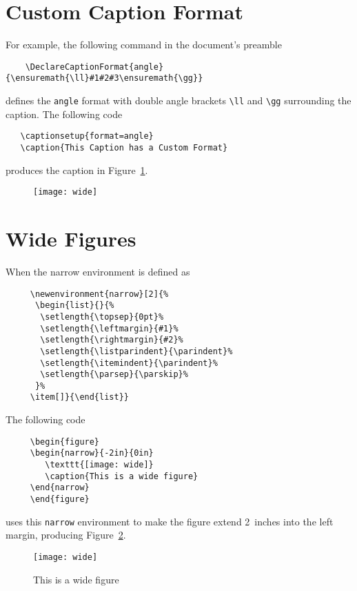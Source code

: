 \documentclass{article}
\newenvironment{narrow}[2]{%
 \begin{list}{}{%
  \setlength{\topsep}{0pt}%
  \setlength{\leftmargin}{#1}%
  \setlength{\rightmargin}{#2}%
  \setlength{\listparindent}{\parindent}%
  \setlength{\itemindent}{\parindent}%
  \setlength{\parsep}{\parskip}%
 }%
\item[]}{\end{list}}
\begin{document}
\newlength{\marginwidth}
\setlength{\marginwidth}{\marginparwidth}
\addtolength{\marginwidth}{\marginparsep}

\section{Custom Caption Format}

For example, the following command in the document's preamble
\begin {verbatim}
    \DeclareCaptionFormat{angle}{\ensuremath{\ll}#1#2#3\ensuremath{\gg}}
\end {verbatim}
defines the \texttt{angle} format with double angle brackets 
\verb+\ll+ and \verb+\gg+ surrounding the caption.
The following code
\begin {verbatim}
   \captionsetup{format=angle}
   \caption{This Caption has a Custom Format}
\end {verbatim}
produces the caption in Figure~\ref{fig:caption:angle}.
\begin{figure}[htbp]
    \centering
    \captionsetup{format=angle}
    \texttt{[image: wide]}
    \label{fig:caption:angle}
\end{figure}

\section{Wide Figures}
When the narrow environment is defined as
\begin {verbatim}
     \newenvironment{narrow}[2]{%
      \begin{list}{}{%
       \setlength{\topsep}{0pt}%
       \setlength{\leftmargin}{#1}%
       \setlength{\rightmargin}{#2}%
       \setlength{\listparindent}{\parindent}%
       \setlength{\itemindent}{\parindent}%
       \setlength{\parsep}{\parskip}%
      }%
     \item[]}{\end{list}} 
\end {verbatim}
The following code 
\begin {verbatim}
     \begin{figure}
     \begin{narrow}{-2in}{0in}
        \texttt{[image: wide]}
        \caption{This is a wide figure}
     \end{narrow}
     \end{figure}
\end {verbatim}
uses this \texttt{narrow} environment to 
make the figure extend 2~inches into the left margin,
producing Figure~\ref{fig:wide}.

\begin{figure}[htbp]
\begin{narrow}{-2in}{0in}
    \texttt{[image: wide]}
    \caption{This is a wide figure}
    \label{fig:wide}
\end{narrow}
\end{figure}
\end{document}
